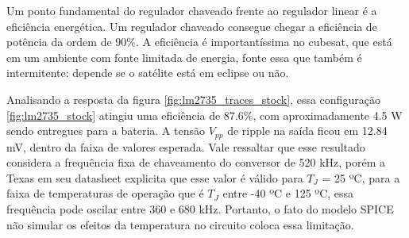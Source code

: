

\noindent
\begin{minipage}{\linewidth}
\label{fig:lm2735_traces_stock}
\end{minipage}

Um ponto fundamental do regulador chaveado frente ao regulador linear é a eficiência energética. Um regulador chaveado consegue chegar a eficiência de potência da ordem de 90\%. A eficiência é importantíssima no cubesat, que está em um ambiente com fonte limitada de energia, fonte essa que também é intermitente: depende se o satélite está em eclipse ou não.

Analisando a resposta da figura \ref{fig:lm2735_traces_stock}, essa configuração \ref{fig:lm2735_stock} atingiu uma eficiência de 87.6\%, com aproximadamente 4.5 W sendo entregues para a bateria. A tensão $V_{pp}$ de ripple na saída ficou em 12.84 mV, dentro da faixa de valores esperada. Vale ressaltar que esse resultado considera a frequência fixa de chaveamento do conversor de 520 kHz, porém a Texas em seu datasheet explicita que esse valor é válido para $T_{J}$ = 25 ºC, para a faixa de temperaturas de operação que é $T_{J}$ entre -40 ºC e 125 ºC, essa frequência pode oscilar entre 360 e 680 kHz. Portanto, o fato do modelo SPICE não simular os efeitos da temperatura no circuito coloca essa limitação.

